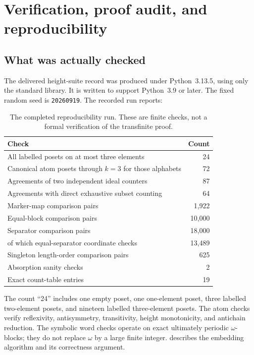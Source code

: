 \documentclass[11pt,a4paper]{article}
\numberwithin{equation}{section}
\theoremstyle{definition}
\theoremstyle{remark}
\begin{document}
\section{Verification, proof audit, and reproducibility}\label{height:sec:audit}

\subsection{What was actually checked}

The delivered height-suite record was produced under Python~3.13.5, using only the standard
library. It is written to support Python~3.9 or later. The fixed random
seed is \texttt{20260919}. The recorded run reports:

\begin{table}[ht]
\centering
\renewcommand{\arraystretch}{1.13}
\begin{tabular}{@{}lr@{}}
\toprule
Check & Count\\
\midrule
All labelled posets on at most three elements & 24\\
Canonical atom posets through $k=3$ for those alphabets & 72\\
Agreements of two independent ideal counters & 87\\
Agreements with direct exhaustive subset counting & 64\\
Marker-map comparison pairs & 1,922\\
Equal-block comparison pairs & 10,000\\
Separator comparison pairs & 18,000\\
\quad of which equal-separator coordinate checks & 13,489\\
Singleton length-order comparison pairs & 625\\
Absorption sanity checks & 2\\
Exact count-table entries & 19\\
\bottomrule
\end{tabular}
\caption{The completed reproducibility run. These are finite checks, not
a formal verification of the transfinite proof.}
\label{height:tab:verification}
\end{table}

The count ``24'' includes one empty poset, one one-element poset, three
labelled two-element posets, and nineteen labelled three-element posets.
The atom checks verify reflexivity, antisymmetry, transitivity,
height monotonicity, and antichain reduction. The symbolic word checks
operate on exact ultimately periodic $\omega$-blocks; they do not replace
$\omega$ by a large finite integer.  describes the
embedding algorithm and its correctness argument.
\end{document}
